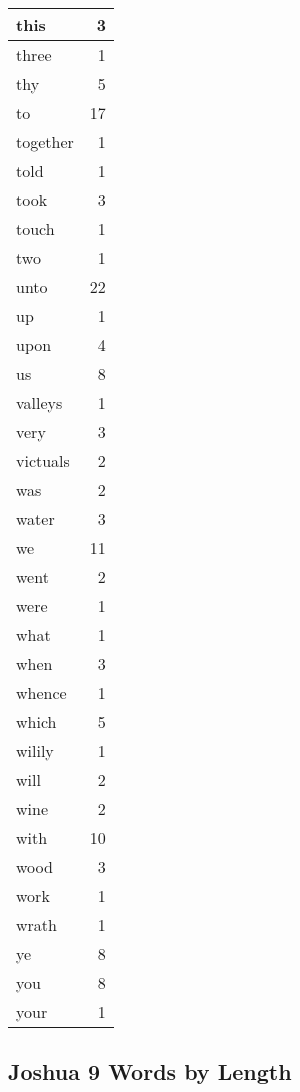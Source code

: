 \begin{center}
\begin{longtable}{l|r}
this & 3\\ \hline 
three & 1\\ \hline 
thy & 5\\ \hline 
to & 17\\ \hline 
together & 1\\ \hline 
told & 1\\ \hline 
took & 3\\ \hline 
touch & 1\\ \hline 
two & 1\\ \hline 
unto & 22\\ \hline 
up & 1\\ \hline 
upon & 4\\ \hline 
us & 8\\ \hline 
valleys & 1\\ \hline 
very & 3\\ \hline 
victuals & 2\\ \hline 
was & 2\\ \hline 
water & 3\\ \hline 
we & 11\\ \hline 
went & 2\\ \hline 
were & 1\\ \hline 
what & 1\\ \hline 
when & 3\\ \hline 
whence & 1\\ \hline 
which & 5\\ \hline 
wilily & 1\\ \hline 
will & 2\\ \hline 
wine & 2\\ \hline 
with & 10\\ \hline 
wood & 3\\ \hline 
work & 1\\ \hline 
wrath & 1\\ \hline 
ye & 8\\ \hline 
you & 8\\ \hline 
your & 1\\ \hline 
\end{longtable}
\end{center}





\subsection{Joshua 9 Words by Length}


\normalsize
 
